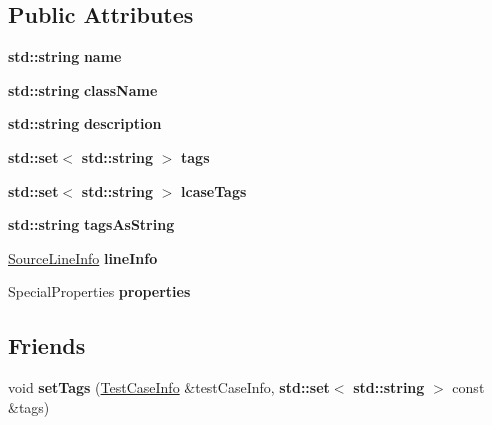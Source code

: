 \subsection*{Public Attributes}
\begin{DoxyCompactItemize}
\item 
\mbox{\label{struct_catch_1_1_test_case_info_a463794e2f5cfead307c93efd134ade36}} 
\textbf{ std\+::string} {\bfseries name}
\item 
\mbox{\label{struct_catch_1_1_test_case_info_a1a5e0825132a38d091defdebbf2f8ce9}} 
\textbf{ std\+::string} {\bfseries class\+Name}
\item 
\mbox{\label{struct_catch_1_1_test_case_info_a37fe2db9425bc45f6a33893eac31198e}} 
\textbf{ std\+::string} {\bfseries description}
\item 
\mbox{\label{struct_catch_1_1_test_case_info_a045f62e7719a8760a5b456f7fd2dc97c}} 
\textbf{ std\+::set}$<$ \textbf{ std\+::string} $>$ {\bfseries tags}
\item 
\mbox{\label{struct_catch_1_1_test_case_info_a0ed3864a313e8ddc3ae38431be5be9ae}} 
\textbf{ std\+::set}$<$ \textbf{ std\+::string} $>$ {\bfseries lcase\+Tags}
\item 
\mbox{\label{struct_catch_1_1_test_case_info_ac65c2d36fd36f71e9bf782b2ea245c64}} 
\textbf{ std\+::string} {\bfseries tags\+As\+String}
\item 
\mbox{\label{struct_catch_1_1_test_case_info_aa9407b7f442655b51a2aad24b3fa2fd3}} 
\hyperlink{struct_catch_1_1_source_line_info}{Source\+Line\+Info} {\bfseries line\+Info}
\item 
\mbox{\label{struct_catch_1_1_test_case_info_afc1e84bd7a2e180895a06d9131302af0}} 
Special\+Properties {\bfseries properties}
\end{DoxyCompactItemize}
\subsection*{Friends}
\begin{DoxyCompactItemize}
\item 
\mbox{\label{struct_catch_1_1_test_case_info_addc10c770e56f49da5baa0c76cf25bd5}} 
void {\bfseries set\+Tags} (\hyperlink{struct_catch_1_1_test_case_info}{Test\+Case\+Info} \&test\+Case\+Info, \textbf{ std\+::set}$<$ \textbf{ std\+::string} $>$ const \&tags)
\end{DoxyCompactItemize}


